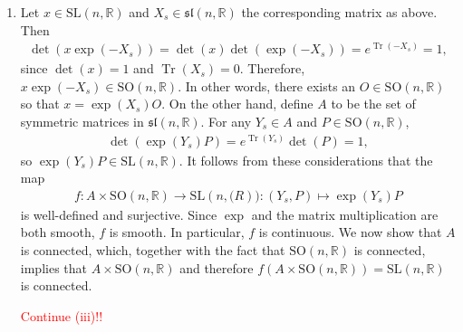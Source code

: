 \documentclass{article}
\DeclareMathOperator{\Tr}{Tr}
\newcommand{\bb}{\mathbb}
\theoremstyle{remark}
\newcommand{\SL}{\mathrm{SL}}
\begin{document}
\begin{enumerate}[label=(\roman*)]
    \item Let $x \in \SL(n,\bb{R})$ and $X_s \in \mathfrak{sl}(n,\bb{R})$ the corresponding matrix as above. Then
    \begin{align*}
        \det\left(x \exp(-X_s)\right) = \det(x) \det\left(\exp(-X_s)\right) = e^{\Tr(-X_s)} = 1,
    \end{align*}
    since $\det(x)=1$ and $\Tr(X_s) = 0$. Therefore, $x \exp(-X_s) \in \mathrm{SO}(n,\bb{R})$. In other words, there exists an $O \in \mathrm{SO}(n,\bb{R})$ so that $x = \exp(X_s)O$. On the other hand, define $A$ to be the set of symmetric matrices in $\mathfrak{sl}(n,\bb{R})$. For any $Y_s \in A$ and $P \in \mathrm{SO}(n,\bb{R})$,
    \begin{align*}
        \det\left(\exp(Y_s) P\right) = e^{\Tr(Y_s)} \det(P) = 1,
    \end{align*}
    so $\exp(Y_s) P \in \SL(n,\bb{R})$. It follows from these considerations that the map
    \begin{align*}
        f : A \times \mathrm{SO}(n,\bb{R}) \to \SL(n,\bb(R)) : (Y_s, P) \mapsto \exp(Y_s)P
    \end{align*}
    is well-defined and surjective. Since $\exp$ and the matrix multiplication are both smooth, $f$ is smooth. In particular, $f$ is continuous. We now show that $A$ is connected, which, together with the fact that $\mathrm{SO}(n,\bb{R})$ is connected, implies that $A \times \mathrm{SO}(n,\bb{R})$ and therefore $f(A \times \mathrm{SO}(n,\bb{R})) = \SL(n,\bb{R})$ is connected.
    
    \textcolor{red}{Continue (iii)!!}


\end{enumerate}
\end{document}
